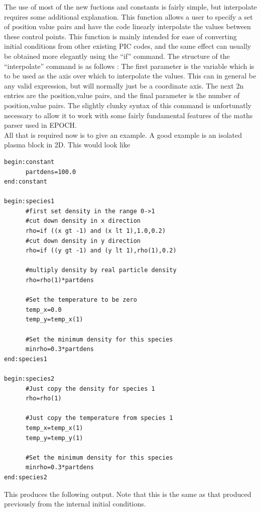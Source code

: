 \documentclass[12pt]{article}
\begin{document}
The use of most of the new fuctions and constants is fairly simple, but interpolate requires some additional explanation. This function allows a user to specify a set of position value pairs and have the code linearly interpolate the values between these control points. This function is mainly intended for ease of converting initial conditions from other existing PIC codes, and the same effect can usually be obtained more elegantly using the ``if'' command. The structure of the ``interpolate'' command is as follows : The first parameter is the variable which is to be used as the axis over which to interpolate the values. This can in general be any valid expression, but will normally just be a coordinate axis. The next 2n entries are the position,value pairs, and the final parameter is the number of position,value pairs. The slightly clunky syntax of this command is unfortunatly necessary to allow it to work with some fairly fundamental features of the maths parser used in EPOCH.\\
All that is required now is to give an example. A good example is an isolated plasma block in 2D. This would look like
\begin{verbatim}
begin:constant
      partdens=100.0
end:constant

begin:species1
      #first set density in the range 0->1
      #cut down density in x direction
      rho=if ((x gt -1) and (x lt 1),1.0,0.2)
      #cut down density in y direction
      rho=if ((y gt -1) and (y lt 1),rho(1),0.2)

      #multiply density by real particle density
      rho=rho(1)*partdens

      #Set the temperature to be zero
      temp_x=0.0
      temp_y=temp_x(1)

      #Set the minimum density for this species
      minrho=0.3*partdens
end:species1

begin:species2
      #Just copy the density for species 1
      rho=rho(1)

      #Just copy the temperature from species 1
      temp_x=temp_x(1)
      temp_y=temp_y(1)

      #Set the minimum density for this species
      minrho=0.3*partdens
end:species2
\end{verbatim}
This produces the following output. Note that this is the same as that produced previously from the internal initial conditions.\\
\end{document}
